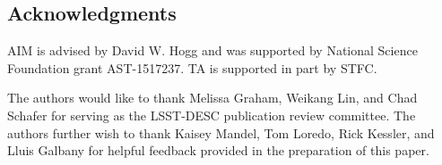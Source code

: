 \documentclass[\docopts]{\docclass}
\begin{document}





\subsection*{Acknowledgments}






AIM is advised by David W. Hogg and was supported by National Science Foundation grant AST-1517237.
TA is supported in part by STFC.

The authors would like to thank Melissa Graham, Weikang Lin, and Chad Schafer for serving as the LSST-DESC publication review committee.
The authors further wish to thank Kaisey Mandel, Tom Loredo, Rick Kessler, and Lluis Galbany for helpful feedback provided in the preparation of this paper.



%
%




\end{document}
